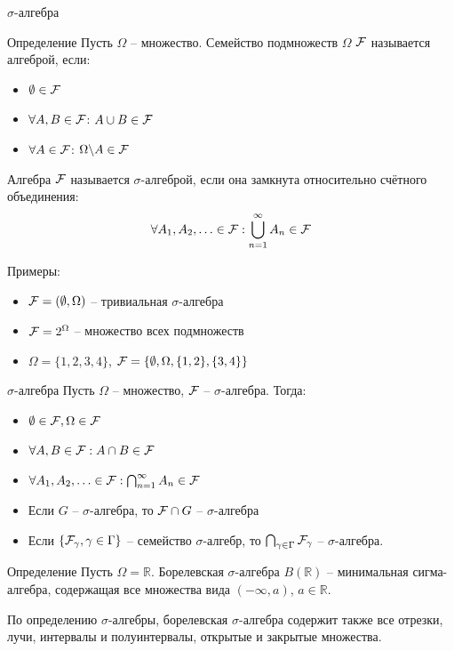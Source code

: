 \documentclass{beamer}
\begin{document}
\begin{frame}{$\sigma$-алгебра}
    \begin{block}{Определение}
        Пусть $\Omega$ -- множество. Семейство подмножеств $\Omega$ $\mathcal{F}$ называется алгеброй, если:
        \begin{itemize}
            \item $\emptyset \in \mathcal{F}$
            \item $\forall A, B \in \mathcal{F}$: $A\cup B\in \mathcal{F}$
            \item $\forall A \in \mathcal{F}$: $\Omega\backslash A \in \mathcal{F}$
        \end{itemize}
    \end{block}
    Алгебра $\mathcal{F}$ называется $\sigma$-алгеброй, если она замкнута относительно счётного объединения: 
    $$\forall A_1, A_2, \ldots \in \mathcal{F}: \bigcup_{n=1}^{\infty} A_n \in \mathcal{F}$$

    Примеры:
    \begin{itemize}
        \item $\mathcal{F}=(\emptyset, \Omega)$ -- тривиальная $\sigma$-алгебра
        \item $\mathcal{F}=2^{\Omega}$ -- множество всех подмножеств
        \item $\Omega = \{1,2,3,4\}$, $\mathcal{F}=\{ \emptyset, \Omega, \{1, 2\}, \{3, 4\} \}$
    \end{itemize}
\end{frame}

\begin{frame}{$\sigma$-алгебра}
    Пусть $\Omega$ -- множество, $\mathcal{F}$ -- $\sigma$-алгебра. Тогда:
    \begin{itemize}
        \item $\emptyset \in \mathcal{F}, \Omega \in \mathcal{F}$
        \item $\forall A, B \in \mathcal{F}: A\cap B\in \mathcal{F}$
        \item $\forall A_1, A_2, \ldots \in \mathcal{F}: \bigcap_{n=1}^{\infty} A_n \in \mathcal{F}$
        \item Если $G$ -- $\sigma$-алгебра, то $\mathcal{F}\cap G$ -- $\sigma$-алгебра
        \item Если $\{\mathcal{F}_{\gamma}, \gamma\in\Gamma\}$ -- семейство $\sigma$-алгебр, то $\bigcap_{\gamma \in \Gamma} \mathcal{F}_{\gamma}$ -- $\sigma$-алгебра.
    \end{itemize}
    \begin{block}{Определение}
        Пусть $\Omega=\mathbb{R}$. Борелевская $\sigma$-алгебра $B(\mathbb{R})$ -- минимальная сигма-алгебра, содержащая все множества вида $(-\infty, a)$, $a\in \mathbb{R}$.
    \end{block}

    По определению $\sigma$-алгебры, борелевская $\sigma$-алгебра содержит также все отрезки, лучи, интервалы и полуинтервалы, открытые и закрытые множества.
    
\end{frame}
\end{document}
